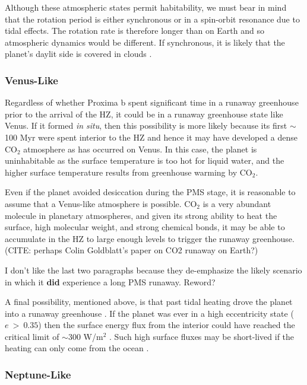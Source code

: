 \documentclass[preprint,12pt]{aastex}
\newcommand{\xxx}[1]{{\color{red} #1}} %
\newcommand{\xxx}[1]{{\color{red} #1}} %
\begin{document}
Although these atmospheric states permit habitability, we must bear in
mind that the rotation period is either synchronous or in a spin-orbit
resonance due to tidal effects. The rotation rate is therefore longer
than on Earth and so atmospheric dynamics would be different. If
synchronous, it is likely that the planet's daylit side is
covered in clouds \citep{Yang13}.

\subsubsection{Venus-Like}
\label{sec:results:atmstates:venuslike}


Regardless of whether Proxima b spent significant time in a runaway
greenhouse prior to the arrival of the HZ, it could be in a runaway
greenhouse state like Venus. If it formed {\it in situ}, then this
possibility is more likely because its first $\sim$100 Myr were spent
interior to the HZ and hence it may have developed a dense CO$_2$
atmosphere as has occurred on Venus. In this case, the planet is
uninhabitable as the surface temperature is too hot for liquid water,
and the higher surface temperature results from greenhouse warming by
CO$_2$.

Even if the planet avoided desiccation during the PMS stage, it is
reasonable to assume that a Venus-like atmosphere is possible. CO$_2$
is a very abundant molecule in planetary atmospheres, and given its
strong ability to heat \xxx{the} surface, high molecular weight, and strong
chemical bonds, it may be able to accumulate in the HZ to large enough
levels to trigger the runaway greenhouse. \xxx{(CITE: perhaps Colin
Goldblatt's paper on CO2 runaway on Earth?)}

\xxx{I don't like the last two paragraphs because they de-emphasize the likely
scenario in which it \textbf{did} experience a long PMS runaway. Reword?}

A final possibility, mentioned above, is that past tidal heating drove
the planet into a runaway greenhouse \citep{Barnes13}. If the planet
was ever in a high eccentricity state ($e~>~0.35$) then the surface
energy flux from the interior could have reached the critical limit of
$\sim$300 W/m$^2$ \citep{Kasting93,Abe93,Goldblatt15}. Such high
surface fluxes may be short-lived if the heating can only come from
the ocean \citep{DriscollBarnes15}.

\subsubsection{Neptune-Like}
\label{sec:results:atmstates:neptunelike}
\end{document}
